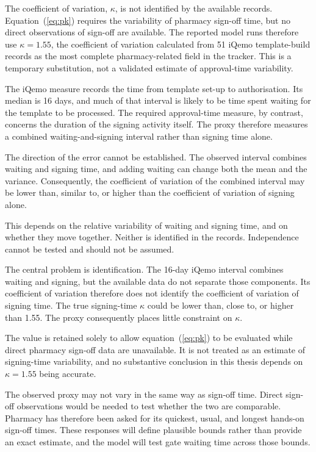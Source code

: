 The coefficient of variation, $\kappa$, is not identified by the available records. Equation~(\ref{eq:pk}) requires the variability of pharmacy sign-off time, but no direct observations of sign-off are available. The reported model runs therefore use $\kappa = 1.55$, the coefficient of variation calculated from 51 iQemo template-build records as the most complete pharmacy-related field in the tracker. This is a temporary substitution, not a validated estimate of approval-time variability.

The iQemo measure records the time from template set-up to authorisation. Its median is 16 days, and much of that interval is likely to be time spent waiting for the template to be processed. The required approval-time measure, by contrast, concerns the duration of the signing activity itself. The proxy therefore measures a combined waiting-and-signing interval rather than signing time alone.

The direction of the error cannot be established. The observed interval combines waiting and signing time, and adding waiting can change both the mean and the variance. Consequently, the coefficient of variation of the combined interval may be lower than, similar to, or higher than the coefficient of variation of signing alone.

This depends on the relative variability of waiting and signing time, and on whether they move together. Neither is identified in the records. Independence cannot be tested and should not be assumed.

The central problem is identification. The 16-day iQemo interval combines waiting and signing, but the available data do not separate those components. Its coefficient of variation therefore does not identify the coefficient of variation of signing time. The true signing-time $\kappa$ could be lower than, close to, or higher than 1.55. The proxy consequently places little constraint on $\kappa$.

The value is retained solely to allow equation~(\ref{eq:pk}) to be evaluated while direct pharmacy sign-off data are unavailable. It is not treated as an estimate of signing-time variability, and no substantive conclusion in this thesis depends on $\kappa = 1.55$ being accurate.

The observed proxy may not vary in the same way as sign-off time. Direct sign-off observations would be needed to test whether the two are comparable. Pharmacy has therefore been asked for its quickest, usual, and longest hands-on sign-off times. These responses will define plausible bounds rather than provide an exact estimate, and the model will test gate waiting time across those bounds.

